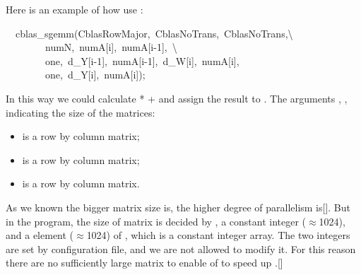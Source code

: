 \documentclass{article}
\begin{document}
\noindent{}Here is an example of how  use :%
\begin{mdpre}%
\noindent~~cblas\_sgemm({CblasRowMajor},~{CblasNoTrans},~{CblasNoTrans},\textbackslash{}\\
~~~~~~~~numN,~numA[i],~numA[i-{1}],~\textbackslash{}\\
~~~~~~~~one,~d\_Y[i-{1}],~numA[i-{1}],~d\_W[i],~numA[i],\\
~~~~~~~~one,~d\_Y[i],~numA[i]);%
\end{mdpre}\noindent{}In this way we could calculate  *  +  and assign the result to . The arguments , ,  indicating the size of the matrices:

\begin{itemize}[noitemsep,topsep=\mdcompacttopsep]%

\item{} is a  row by  column matrix;%

\item{} is a  row by  column matrix;%

\item{} is a  row by  column matrix.%
\end{itemize}%

\noindent{}As we known the bigger matrix size is, the higher degree of  parallelism is[]. But in the  program, the size of matrix is decided by , a constant integer (\ensuremath{\approx}1024), and a element (\ensuremath{\approx}1024) of , which is a constant integer array. The two integers are set by configuration file, and we are not allowed to modify it. For this reason there are no sufficiently large matrix to enable  of  to speed up .[]%
\end{document}
